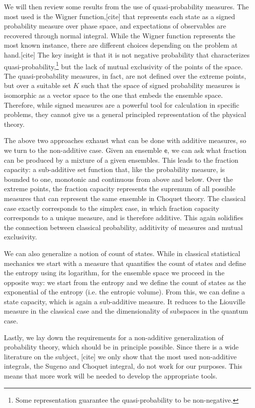 \documentclass[10pt,twocolumn, nofootinbib]{revtex4-2}
\newcommand{\ens}[1][e] {\mathsf{#1}} %
\begin{document}
We will then review some results from the use of quasi-probability measures. The most used is the Wigner function,[cite] that represents each state as a signed probability measure over phase space, and expectations of observables are recovered through normal integral. While the Wigner function represents the most known instance, there are different choices depending on the problem at hand.[cite] The key insight is that it is not negative probability that characterizes quasi-probability,\footnote{Some representation guarantee the quasi-probability to be non-negative.} but the lack of mutual exclusivity of the points of the space. The quasi-probability measures, in fact, are not defined over the extreme points, but over a suitable set $K$ such that the space of signed probability measures is isomorphic as a vector space to the one that embeds the ensemble space. Therefore, while signed measures are a powerful tool for calculation in specific problems, they cannot give us a general principled representation of the physical theory.

The above two approaches exhaust what can be done with additive measures, so we turn to the non-additive case. Given an ensemble $\ens$, we can ask what fraction can be produced by a mixture of a given ensembles. This leads to the fraction capacity: a sub-additive set function that, like the probability measure, is bounded to one, monotonic and continuous from above and below. Over the extreme points, the fraction capacity represents the supremum of all possible measures that can represent the same ensemble in Choquet theory. The classical case exactly corresponds to the simplex case, in which fraction capacity corresponds to a unique measure, and is therefore additive. This again solidifies the connection between classical probability, additivity of measures and mutual exclusivity.

We can also generalize a notion of count of states. While in classical statistical mechanics we start with a measure that quantifies the count of states and define the entropy using its logarithm, for the ensemble space we proceed in the opposite way: we start from the entropy and we define the count of states as the exponential of the entropy (i.e. the entropic volume). From this, we can define a state capacity, which is again a sub-additive measure. It reduces to the Liouville measure in the classical case and the dimensionality of subspaces in the quantum case.

Lastly, we lay down the requirements for a non-additive generalization of probability theory, which should be in principle possible. Since there is a wide literature on the subject, [cite] we only show that the most used non-additive integrals, the Sugeno and Choquet integral, do not work for our purposes. This means that more work will be needed to develop the appropriate tools.
\end{document}
